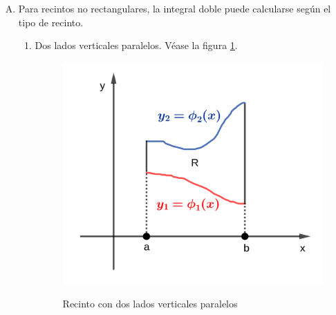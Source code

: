 \documentclass{article}
\renewcommand{\Bbb}{\mathbb}
\begin{document}
\begin{enumerate}[(A)]
\begin{equation}
\tcboxmath[colback=orange!25!white,colframe=orange, title=Teorema de Fubbini]
{
\begin{array}{ll}
\iint_R f(x,y) \mathop{dx} \mathop{dy} = \int_a^b \left( \int_c^d f(x,y) \mathop{dy} \right) \mathop{dx} \\
\iint_R f(x,y) \mathop{dx} \mathop{dy} = \int_c^d \left( \int_a^b f(x,y) \mathop{dx} \right) \mathop{dy}
\end{array}
}
\end{equation}

Lo que este teorema dice es que dadas sus condiciones, la integral doble puede resolverse integrando primero respecto a $x$ y luego $y$, o viceversa. El resultado debería ser el mismo.

¿Qué se entiende por \textbf{conjunto de contenido nulo}? En $\Bbb R^2$, es un recinto de área nula. En $\Bbb R$, un segmento de longitud nula. En $\Bbb R^3$, volumen nulo. Para mayores dimensiones, será un concepto extendido de tamaño de un recinto.

\item Para recintos no rectangulares, la integral doble puede calcularse según el tipo de recinto.

\begin{enumerate}
\item Dos lados verticales paralelos. Véase la figura \ref{fig:d1}.

\begin{figure}[ht]
\centering
\caption{Recinto con dos lados verticales paralelos}
\includegraphics[scale=0.75]{img/integrales/im_d1.png}
\label{fig:d1}
\end{figure}


\end{enumerate}
\end{enumerate}
\end{document}
